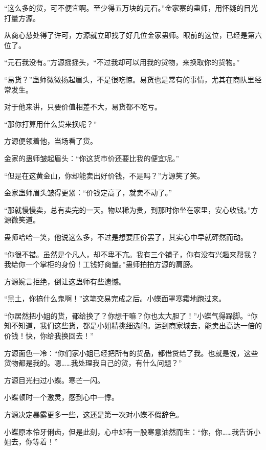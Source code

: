 
\begin{this_body}



“这么多的货，可不便宜啊。至少得五万块的元石。”金家寨的蛊师，用怀疑的目光打量方源。

从商心慈处得了许可，方源就立即找了好几位金家蛊师。眼前的这位，已经是第六位了。

“元石我没有。”方源摇摇头，“不过我却可以用我的货物，来换取你的货物。”

“易货？”蛊师微微扬起眉头，不是很吃惊。易货也是常有的事情，尤其在商队里经常发生。

对于他来讲，只要价值相差不大，易货都不吃亏。

“那你打算用什么货来换呢？”

方源便领着他，当场看了货。

金家的蛊师皱起眉头：“你这货市价还要比我的便宜呢。”

“但是在这黄金山，你却能卖出好价钱，不是吗？”方源笑了笑。

金家蛊师眉头皱得更紧：“价钱定高了，就卖不动了。”

“那就慢慢卖，总有卖完的一天。物以稀为贵，到那时你坐在家里，安心收钱。”方源微笑道。

蛊师哈哈一笑，他说这么多，不过是想要压价罢了，其实心中早就砰然而动。

“你很不错。虽然是个凡人，却不卑不亢。我有三个铺子，你有没有兴趣来帮我？我给你一个掌柜的身份！工钱好商量。”蛊师拍拍方源的肩膀。

方源婉言拒绝，倒让这蛊师有些遗憾。

“黑土，你搞什么鬼啊！”这笔交易完成之后。小蝶面罩寒霜地跑过来。

“你居然把小姐的货，都给换了？你想干嘛？你也太大胆了！”小蝶气得跺脚。“你知不知道，我们这些货，都是小姐精挑细选的。运到商家城去，能卖出高达一倍的价钱！快，你给我换回去！”

方源面色一冷：“你们家小姐已经把所有的货品，都借贷给了我。也就是说，这些货物都是我的。嗯……我处理我自己的货，有什么问题？”

方源目光扫过小蝶。寒芒一闪。

小蝶顿时一个激灵，感到心中一悸。

方源决定暴露更多一些，这还是第一次对小蝶不假辞色。

小蝶原本伶牙俐齿，但是此刻，心中却有一股寒意油然而生：“你，你……我告诉小姐去，你等着！”


\end{this_body}
